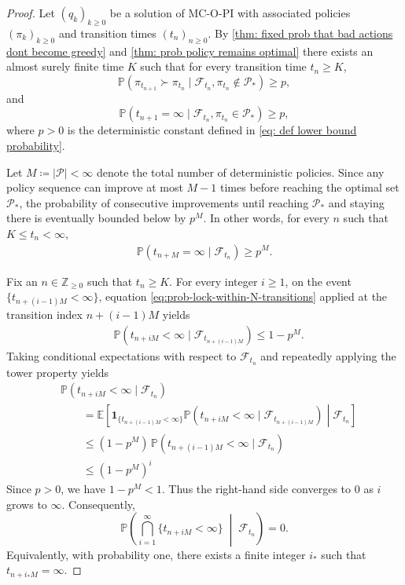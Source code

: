 \begin{proof}
Let $(q_k)_{k \ge 0}$ be a solution of MC-O-PI with associated policies $(\pi_k)_{k \ge 0}$ and transition times $(t_n)_{n \ge 0}$.
% 
By \autoref{thm: fixed prob that bad actions dont become greedy} and \autoref{thm: prob policy remains optimal}
there exists an almost surely finite time $K$ such that for every transition time $t_n \ge K$,
\[
\mathbb P (
\pi_{t_{n+1}} \succ \pi_{t_n}
\mid
\mathcal F_{t_n}, \pi_{t_n} \notin \mathcal P_*
)
\ge p ,
\]
and
\[
\mathbb P\!\left(
t_{n+1} = \infty
\mid
\mathcal F_{t_n}, \pi_{t_n} \in \mathcal P_*
\right)
\ge p ,
\]
where $p>0$ is the deterministic constant defined in \eqref{eq: def lower bound probability}.

Let $M \coloneqq |\mathcal{P}| < \infty$ denote the total number of deterministic policies.
Since any policy sequence can improve at most $M - 1$ times before reaching the optimal set $\mathcal{P}_*$, the probability of consecutive improvements until reaching $\mathcal{P}_*$ and staying there is eventually bounded below by $p^M$. In other words, for every $n$ such that $K \le t_n < \infty$,
\begin{align}
\label{eq:prob-lock-within-N-transitions}
\mathbb P\!\left(
t_{n+M} = \infty
\mid
\mathcal F_{t_n}
\right)
\ge p^M .
\end{align}

Fix an $n \in \mathbb Z_{\ge 0}$ such that $t_n \ge K$.
For every integer $i \ge 1$, on the event $\{t_{n+(i-1)M} < \infty\}$, 
equation \eqref{eq:prob-lock-within-N-transitions} applied at the transition index $n+(i-1)M$ yields
\begin{align*}
&\mathbb P (
t_{n+iM} < \infty
\mid
\mathcal F_{t_{n+(i-1)M}} )
\le 1-p^M .
\end{align*}
Taking conditional expectations with respect to $\mathcal{F}_{t_n}$ and repeatedly applying the tower property yields
\begin{align*}
\nonumber
&\mathbb P (
t_{n+iM} < \infty
\mid
\mathcal F_{t_{n}}
)
\\
&\qquad =
\mathbb E\!\left[
\mathbf 1_{\{t_{n+(i-1)M}<\infty\}}
\mathbb P (
t_{n+i M} < \infty
\mid
\mathcal F_{t_{n+(i-1)M}}
)
\middle|
\mathcal F_{t_{n}}
\right]
\\
&\qquad \le
(1-p^M)\,
\mathbb P (
t_{n+(i-1)M} < \infty
\mid
\mathcal F_{t_{n}}
)
\\
&\qquad \le
(1-p^M)^i
\end{align*}
Since $p > 0$, we have $1 - p^M<1$. Thus the right-hand side converges to 0 as $i$ grows to $\infty$. Consequently,
\[
\mathbb{P}\!\left( \bigcap_{i=1}^\infty \big\{ t_{n+iM} < \infty \big\} \;\middle|\; \mathcal{F}_{t_n} \right) = 0.
\]
Equivalently, with probability one, there exists a finite integer $i_*$ such that $t_{n+i_* M} = \infty$.


\end{proof}

